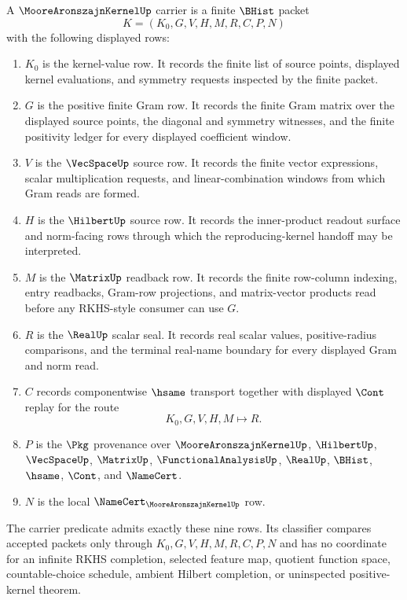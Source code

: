 \begin{definition}
\label{def:moore-aronszajn-kernel-carrier}
A $\MooreAronszajnKernelUp$ carrier is a finite $\BHist$ packet
$$
K=(K_0,G,V,H,M,R,C,P,N)
$$
with the following displayed rows:
\begin{enumerate}
\item $K_0$ is the kernel-value row. It records the finite list of source points, displayed kernel evaluations, and symmetry requests inspected by the finite packet.
\item $G$ is the positive finite Gram row. It records the finite Gram matrix over the displayed source points, the diagonal and symmetry witnesses, and the finite positivity ledger for every displayed coefficient window.
\item $V$ is the $\VecSpaceUp$ source row. It records the finite vector expressions, scalar multiplication requests, and linear-combination windows from which Gram reads are formed.
\item $H$ is the $\HilbertUp$ source row. It records the inner-product readout surface and norm-facing rows through which the reproducing-kernel handoff may be interpreted.
\item $M$ is the $\MatrixUp$ readback row. It records the finite row-column indexing, entry readbacks, Gram-row projections, and matrix-vector products read before any RKHS-style consumer can use $G$.
\item $R$ is the $\RealUp$ scalar seal. It records real scalar values, positive-radius comparisons, and the terminal real-name boundary for every displayed Gram and norm read.
\item $C$ records componentwise $\hsame$ transport together with displayed $\Cont$ replay for the route
$$
K_0,G,V,H,M \longmapsto R .
$$
\item $P$ is the $\Pkg$ provenance over $\MooreAronszajnKernelUp$, $\HilbertUp$, $\VecSpaceUp$, $\MatrixUp$, $\FunctionalAnalysisUp$, $\RealUp$, $\BHist$, $\hsame$, $\Cont$, and $\NameCert$.
\item $N$ is the local $\NameCert_{\MooreAronszajnKernelUp}$ row.
\end{enumerate}
The carrier predicate admits exactly these nine rows. Its classifier compares accepted packets only through $K_0,G,V,H,M,R,C,P,N$ and has no coordinate for an infinite RKHS completion, selected feature map, quotient function space, countable-choice schedule, ambient Hilbert completion, or uninspected positive-kernel theorem.
\end{definition}

